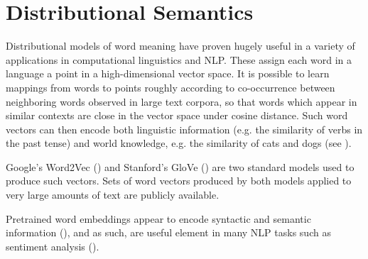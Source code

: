 \documentclass[10pt,letterpaper,twocolumn]{article}
\begin{document}


\section{Distributional Semantics} \label{distmods}

Distributional models of word meaning have proven hugely useful in a variety of applications in computational linguistics and NLP. These assign each word in a language a point in a high-dimensional vector space. It is possible to learn mappings from words to points roughly according to co-occurrence between neighboring words observed in large text corpora, so that words which appear in similar contexts are close in the vector space under cosine distance. Such word vectors can then encode both linguistic information (e.g. the similarity of verbs in the past tense) and world knowledge, e.g. the similarity of cats and dogs (see \cite{finley2017analogies}).


Google's Word2Vec (\cite{mikolov2013distributed}) and Stanford's GloVe (\cite{pennington2014glove}) are two standard models used to produce such vectors. Sets of word vectors produced by both models applied to very large amounts of text are publicly available.

Pretrained word embeddings appear to encode syntactic and semantic information (\cite{mikolov2013linguistic}), and as such, are useful element in many NLP tasks such as sentiment analysis (\cite{socher2013recursive}).

	
	
\end{document}
